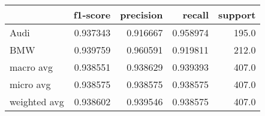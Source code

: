 \begin{tabular}{lrrrr}
\toprule
{} &  f1-score &  precision &    recall &  support \\
\midrule
Audi         &  0.937343 &   0.916667 &  0.958974 &    195.0 \\
BMW          &  0.939759 &   0.960591 &  0.919811 &    212.0 \\
macro avg    &  0.938551 &   0.938629 &  0.939393 &    407.0 \\
micro avg    &  0.938575 &   0.938575 &  0.938575 &    407.0 \\
weighted avg &  0.938602 &   0.939546 &  0.938575 &    407.0 \\
\bottomrule
\end{tabular}
